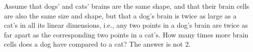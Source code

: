 Assume that dogs' and cats' brains are the same shape, and that their brain cells
        are also the same size and shape,
        but that a dog's brain is twice as large as a cat's in all its linear dimensions, i.e.,
        any two points in a dog's brain are twice as far apart as the corresponding two
        points in a cat's. How many times more brain cells does a dog have compared to a
        cat? The answer is not 2.
